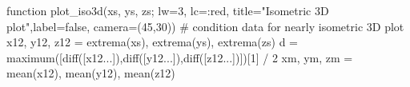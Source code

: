 \documentclass[
  a4paper,
  DIV=11]{scrreprt}
\newenvironment{Shaded}{\begin{snugshade}}{\end{snugshade}}
\newcommand{\CommentTok}[1]{\textcolor[rgb]{0.37,0.37,0.37}{#1}}
\newcommand{\ConstantTok}[1]{\textcolor[rgb]{0.56,0.35,0.01}{#1}}
\newcommand{\FloatTok}[1]{\textcolor[rgb]{0.68,0.00,0.00}{#1}}
\newcommand{\FunctionTok}[1]{\textcolor[rgb]{0.28,0.35,0.67}{#1}}
\newcommand{\KeywordTok}[1]{\textcolor[rgb]{0.00,0.23,0.31}{#1}}
\newcommand{\NormalTok}[1]{\textcolor[rgb]{0.00,0.23,0.31}{#1}}
\newcommand{\OperatorTok}[1]{\textcolor[rgb]{0.37,0.37,0.37}{#1}}
\newcommand{\StringTok}[1]{\textcolor[rgb]{0.13,0.47,0.30}{#1}}
\begin{document}
\begin{Shaded}
\begin{Highlighting}[]
\KeywordTok{function} \FunctionTok{plot\_iso3d}\NormalTok{(xs, ys, zs; lw}\OperatorTok{=}\FloatTok{3}\NormalTok{, lc}\OperatorTok{=:}\NormalTok{red, title}\OperatorTok{=}\StringTok{"Isometric 3D plot"}\NormalTok{,label}\OperatorTok{=}\ConstantTok{false}\NormalTok{, camera}\OperatorTok{=}\NormalTok{(}\FloatTok{45}\NormalTok{,}\FloatTok{30}\NormalTok{))}
    \CommentTok{\# condition data for nearly isometric 3D plot }
\NormalTok{    x12, y12, z12 }\OperatorTok{=} \FunctionTok{extrema}\NormalTok{(xs), }\FunctionTok{extrema}\NormalTok{(ys), }\FunctionTok{extrema}\NormalTok{(zs)}
\NormalTok{    d }\OperatorTok{=} \FunctionTok{maximum}\NormalTok{([}\FunctionTok{diff}\NormalTok{([x12}\OperatorTok{...}\NormalTok{]),}\FunctionTok{diff}\NormalTok{([y12}\OperatorTok{...}\NormalTok{]),}\FunctionTok{diff}\NormalTok{([z12}\OperatorTok{...}\NormalTok{])])[}\FloatTok{1}\NormalTok{] }\OperatorTok{/} \FloatTok{2}
\NormalTok{    xm, ym, zm }\OperatorTok{=} \FunctionTok{mean}\NormalTok{(x12),  }\FunctionTok{mean}\NormalTok{(y12),  }\FunctionTok{mean}\NormalTok{(z12) }


\end{Highlighting}
\end{Shaded}
\end{document}
